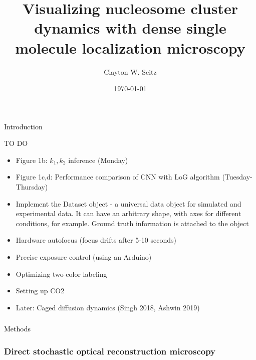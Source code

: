 \documentclass{beamer}					%
\title{Visualizing nucleosome cluster dynamics with dense single molecule localization microscopy}	%
\author{Clayton W. Seitz}								%
\date{\today}									%
\begin{document}
\begin{frame}
  \titlepage
\end{frame}


%


\begin{frame}
\frametitle{}
\centering
\Large \textcolor{black}{Introduction}
\end{frame}


\begin{frame}{TO DO}
\begin{itemize}
\item Figure 1b: $k_{1},k_{2}$ inference (Monday)
\item Figure 1c,d: Performance comparison of CNN with LoG algorithm (Tuesday-Thursday)
\item Implement the Dataset object - a universal data object for simulated and experimental data. It can have an arbitrary shape, with axes for different conditions, for example. Ground truth information is attached to the object
\item Hardware autofocus (focus drifts after 5-10 seconds)
\item Precise exposure control (using an Arduino)
\item Optimizing two-color labeling
\item Setting up CO2 
\item Later: Caged diffusion dynamics (Singh 2018, Ashwin 2019)
\end{itemize}
\end{frame}


\begin{frame}
\frametitle{}
\centering
\Large \textcolor{black}{Methods}
\end{frame}



\begin{frame}
\frametitle{Direct stochastic optical reconstruction microscopy}

\end{frame}
\end{document}
